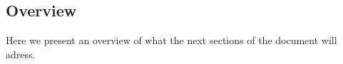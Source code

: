\subsection{Overview}
\label{subsect:overview}

Here we present an overview of what the next sections of the document will adress.



